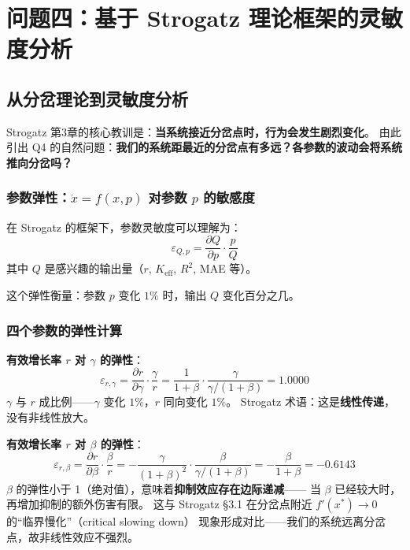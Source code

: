 \documentclass[12pt,a4paper]{article}
\begin{document}
\section{问题四：基于 Strogatz 理论框架的灵敏度分析}

\subsection{从分岔理论到灵敏度分析}

Strogatz 第3章的核心教训是：\textbf{当系统接近分岔点时，行为会发生剧烈变化}。
由此引出 Q4 的自然问题：\textbf{我们的系统距最近的分岔点有多远？各参数的波动会将系统推向分岔吗？}

\subsubsection{参数弹性：$\dot{x} = f(x, p)$ 对参数 $p$ 的敏感度}

在 Strogatz 的框架下，参数灵敏度可以理解为：
\begin{equation}
\varepsilon_{Q, p} = \frac{\partial Q}{\partial p} \cdot \frac{p}{Q}
\end{equation}
其中 $Q$ 是感兴趣的输出量（$r$, $K_{\text{eff}}$, $R^2$, MAE 等）。

这个弹性衡量：参数 $p$ 变化 $1\%$ 时，输出 $Q$ 变化百分之几。

\subsubsection{四个参数的弹性计算}

\textbf{有效增长率 $r$ 对 $\gamma$ 的弹性}：
\begin{equation}
\varepsilon_{r, \gamma} = \frac{\partial r}{\partial \gamma} \cdot \frac{\gamma}{r}
= \frac{1}{1+\beta} \cdot \frac{\gamma}{\gamma/(1+\beta)} = 1.0000
\end{equation}
$\gamma$ 与 $r$ 成比例——$\gamma$ 变化 $1\%$，$r$ 同向变化 $1\%$。
Strogatz 术语：这是\textbf{线性传递}，没有非线性放大。

\textbf{有效增长率 $r$ 对 $\beta$ 的弹性}：
\begin{equation}
\varepsilon_{r, \beta} = \frac{\partial r}{\partial \beta} \cdot \frac{\beta}{r}
= -\frac{\gamma}{(1+\beta)^2} \cdot \frac{\beta}{\gamma/(1+\beta)}
= -\frac{\beta}{1+\beta} = -0.6143
\end{equation}
$\beta$ 的弹性小于 1（绝对值），意味着\textbf{抑制效应存在边际递减}——
当 $\beta$ 已经较大时，再增加抑制的额外伤害有限。
这与 Strogatz \S3.1 在分岔点附近 $f'(x^*) \to 0$ 的``临界慢化''（critical slowing down）
现象形成对比——我们的系统远离分岔点，故非线性效应不强烈。
\end{document}

